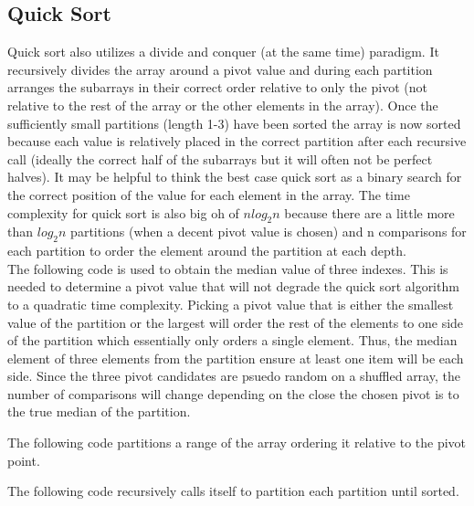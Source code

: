 \documentclass[letterpaper, 10pt]{article}
\begin{document}
\subsection{Quick Sort}
Quick sort also utilizes a divide and conquer (at the same time) paradigm. It recursively divides the array around
a pivot value and during each partition arranges the subarrays in their correct order relative to
only the pivot (not relative to the rest of the array or the other elements in the array). Once
the sufficiently small partitions (length 1-3) have been sorted the array is now sorted because
each value is relatively placed in the correct partition after each recursive call 
(ideally the correct half of the subarrays but it will often not be perfect halves).
It may be helpful to think the best case quick sort as a binary search for the correct position
of the value for each element in the array. The time complexity for quick sort is also big oh of
\(nlog_2n\) because there are a little more than \(log_2n \) partitions 
(when a decent pivot value is chosen) and n comparisons for each partition to order the element around
the partition at each depth.\\
\newline
The following code is used to obtain the median value of three indexes. This is needed to determine
a pivot value that will not degrade the quick sort algorithm to a quadratic time complexity. Picking 
a pivot value that is either the smallest value of the partition or the largest will order the rest 
of the elements to one side of the partition which essentially only orders a single element. Thus, the
median element of three elements from the partition ensure at least one item will be each side.
Since the three pivot candidates are psuedo random on a shuffled array, the number of comparisons
will change depending on the close the chosen pivot is to the true median of the partition.

The following code partitions a range of the array ordering it relative to the pivot point.

The following code recursively calls itself to partition each partition until sorted.

\end{document}
